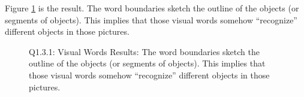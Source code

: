 \documentclass[
  course = {{16-720B Computer Vision}},
  quartile = {{1}},
  assignment = 2-Bag\ of \ Visual\ Words,
  name = {{Kangle Deng}},
  email = {{kangled@andrew.cmu.edu}},
  firstexercise = 1
]{aga-homework}
\begin{document}
Figure \ref{fig:hw2_q131} is the result. The word boundaries sketch the outline of the objects (or segments of objects). This implies that those visual words somehow ``recognize'' different objects in those pictures.
\begin{figure}
    \centering
    \caption{Q1.3.1: Visual Words Results: The word boundaries sketch the outline of the objects (or segments of objects). This implies that those visual words somehow ``recognize'' different objects in those pictures.}
    \label{fig:hw2_q131}
\end{figure}
\end{document}
